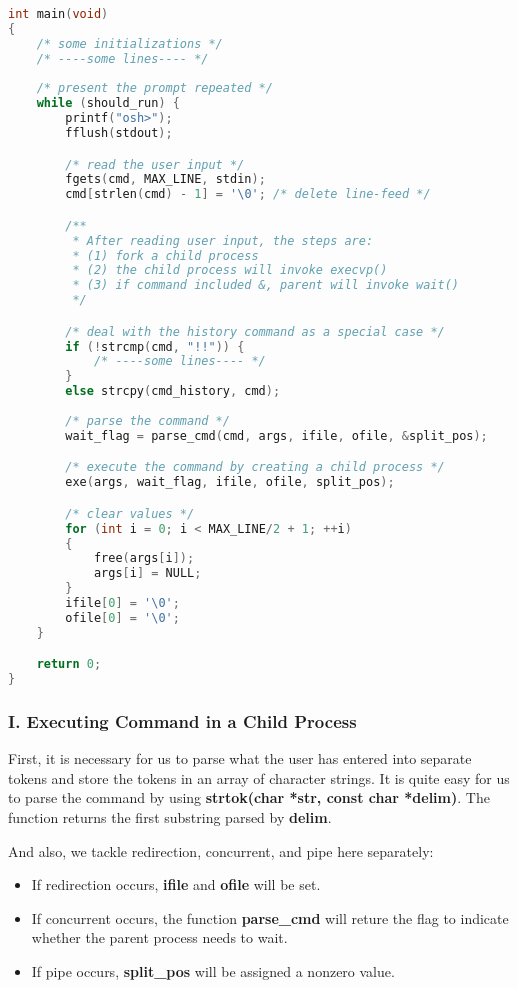 \documentclass{article}
\begin{document}
\begin{lstlisting}[language=c]
int main(void)
{
    /* some initializations */
    /* ----some lines---- */
    
    /* present the prompt repeated */
    while (should_run) {   
        printf("osh>");
        fflush(stdout);

        /* read the user input */
        fgets(cmd, MAX_LINE, stdin);
        cmd[strlen(cmd) - 1] = '\0'; /* delete line-feed */

        /**
         * After reading user input, the steps are:
         * (1) fork a child process
         * (2) the child process will invoke execvp()
         * (3) if command included &, parent will invoke wait()
         */

        /* deal with the history command as a special case */
        if (!strcmp(cmd, "!!")) {
            /* ----some lines---- */
        }	
        else strcpy(cmd_history, cmd);
        
        /* parse the command */
        wait_flag = parse_cmd(cmd, args, ifile, ofile, &split_pos);

        /* execute the command by creating a child process */
        exe(args, wait_flag, ifile, ofile, split_pos);

        /* clear values */
        for (int i = 0; i < MAX_LINE/2 + 1; ++i) 
        {	
            free(args[i]);
            args[i] = NULL;
        }
        ifile[0] = '\0';
        ofile[0] = '\0';
    }

    return 0;
}
\end{lstlisting}

\subsubsection*{I. Executing Command in a Child Process}
First, it is necessary for us to parse what the user has entered into separate tokens and store the tokens in an array of character strings.
It is quite easy for us to parse the command by using \textbf{strtok(char *str, const char *delim)}. The function returns the first substring parsed
by \textbf{delim}. 

And also, we tackle redirection, concurrent, and pipe here separately: 

\begin{itemize}
    \item If redirection occurs, \textbf{ifile} and \textbf{ofile} will be set. 
    \item If concurrent occurs, the function \textbf{parse\_cmd} will reture the flag to indicate whether the parent process needs to wait.
    \item If pipe occurs, \textbf{split\_pos} will be assigned a nonzero value.
\end{itemize}
\end{document}
